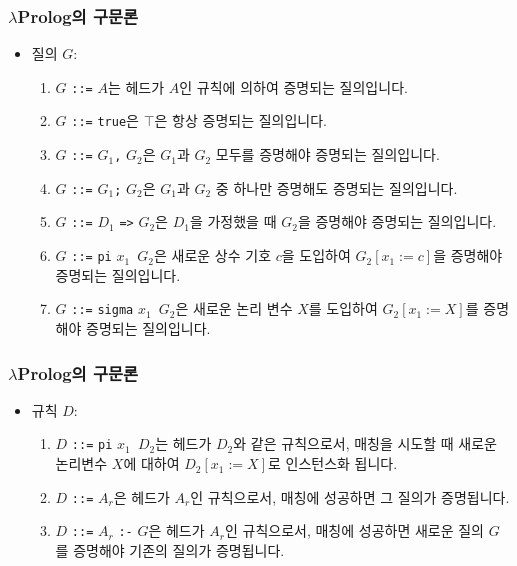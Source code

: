 \documentclass[slidestop,compress,mathserif]{beamer}
\begin{document}
    \begin{frame}
        \frametitle{$\lambda$Prolog의 구문론}
        \begin{itemize}
            \item 질의 $G$:
            \begin{enumerate}
                \item $G$ \texttt{::=} $A$는 헤드가 $A$인 규칙에 의하여 증명되는 질의입니다.
                \item $G$ \texttt{::=} \texttt{true}은 $\top$은 항상 증명되는 질의입니다.
                \item $G$ \texttt{::=} $G_1$\texttt{,} $G_2$은 $G_1$과 $G_2$ 모두를 증명해야 증명되는 질의입니다.
                \item $G$ \texttt{::=} $G_1$\texttt{;} $G_2$은 $G_1$과 $G_2$ 중 하나만 증명해도 증명되는 질의입니다.
                \item $G$ \texttt{::=} $D_1$ \texttt{=>} $G_2$은 $D_1$을 가정했을 때 $G_2$을 증명해야 증명되는 질의입니다.
                \item $G$ \texttt{::=} \texttt{pi} $x_1$\texttt{\string\ }$G_2$은 새로운 상수 기호 $c$을 도입하여 $G_2 \left[ x_1 := c \right]$을 증명해야 증명되는 질의입니다.
                \item $G$ \texttt{::=} \texttt{sigma} $x_1$\texttt{\string\ }$G_2$은 새로운 논리 변수 $X$를 도입하여 $G_2 \left[ x_1 := X \right]$를 증명해야 증명되는 질의입니다.
            \end{enumerate}
        \end{itemize}
    \end{frame}

    \begin{frame}
        \frametitle{$\lambda$Prolog의 구문론}
        \begin{itemize}
            \item 규칙 $D$:
            \begin{enumerate}
                \item $D$ \texttt{::=} \texttt{pi} $x_1$\texttt{\string\ }$D_2$는 헤드가 $D_2$와 같은 규칙으로서, 매칭을 시도할 때 새로운 논리변수 $X$에 대하여 $D_2 \left[ x_1 := X \right]$로 인스턴스화 됩니다.
                \item $D$ \texttt{::=} $A_r$은 헤드가 $A_r$인 규칙으로서, 매칭에 성공하면 그 질의가 증명됩니다.
                \item $D$ \texttt{::=} $A_r$ \texttt{:-} $G$은 헤드가 $A_r$인 규칙으로서, 매칭에 성공하면 새로운 질의 $G$를 증명해야 기존의 질의가 증명됩니다.
            \end{enumerate}
        \end{itemize}
    \end{frame}
\end{document}

